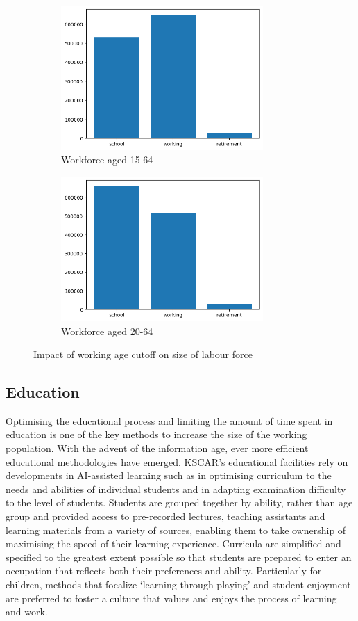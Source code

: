 \documentclass[fleqn,10pt]{Stylesheet} %
\begin{document}
\begin{figure}[t!]
    \begin{subfigure}[t]{0.45\textwidth}
        \centering
        \includegraphics[height=55mm]{fig_demo_down.png}
        \caption{Workforce aged 15-64}
    \end{subfigure}
    \qquad \qquad  %
    \begin{subfigure}[t]{0.45\textwidth}
        \centering
        \includegraphics[height=55mm]{fig_demo.png}
        \caption{Workforce aged 20-64}
    \end{subfigure}%
\caption{Impact of working age cutoff on size of labour force}
\label{fig:workingage}
\end{figure}

\subsection{Education}
\label{sec:education}
Optimising the educational process and limiting the amount of time spent in education is one of the key methods to increase the size of the working population. With the advent of the information age, ever more efficient educational methodologies have emerged. KSCAR's educational facilities rely on developments in AI-assisted learning such as in optimising curriculum to the needs and abilities of individual students and in adapting examination difficulty to the level of students. Students are grouped together by ability, rather than age group and provided access to pre-recorded lectures, teaching assistants and learning materials from a variety of sources, enabling them to take ownership of maximising the speed of their learning experience. Curricula are simplified and specified to the greatest extent possible so that students are prepared to enter an occupation that reflects both their preferences and ability. Particularly for children, methods that focalize ‘learning through playing’ and student enjoyment are preferred to foster a culture that values and enjoys the process of learning and work.
\end{document}
